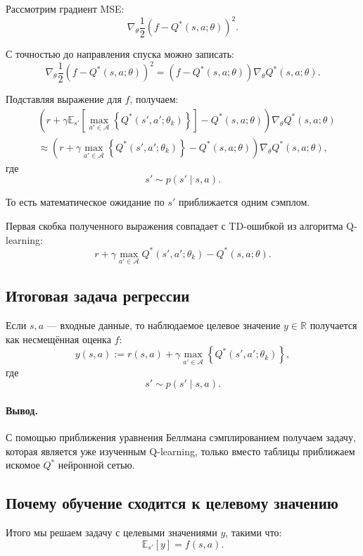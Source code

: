 \documentclass[12pt,a4paper]{article}
\begin{document}
Рассмотрим градиент MSE:
\[
\nabla_\theta
\frac{1}{2}
\left(
f
-
Q^\ast(s,a;\theta)
\right)^2.
\]

С точностью до направления спуска можно записать:
\[
\nabla_\theta
\frac{1}{2}
\left(
f
-
Q^\ast(s,a;\theta)
\right)^2
=
\left(
f
-
Q^\ast(s,a;\theta)
\right)
\nabla_\theta Q^\ast(s,a;\theta).
\]

Подставляя выражение для $f$, получаем:
\[
\begin{aligned}
&
\left(
r
+
\gamma
\mathbb E_{s'}
\left[
\max_{a' \in \mathcal A}
\left\{
Q^\ast(s',a';\theta_k)
\right\}
\right]
-
Q^\ast(s,a;\theta)
\right)
\nabla_\theta Q^\ast(s,a;\theta)
\\
&\approx
\left(
r
+
\gamma
\max_{a' \in \mathcal A}
\left\{
Q^\ast(s',a';\theta_k)
\right\}
-
Q^\ast(s,a;\theta)
\right)
\nabla_\theta Q^\ast(s,a;\theta),
\end{aligned}
\]
где
\[
s' \sim p(s'\mid s,a).
\]

То есть математическое ожидание по $s'$ приближается одним сэмплом.

Первая скобка полученного выражения совпадает с TD-ошибкой из алгоритма Q-learning:
\[
r
+
\gamma
\max_{a' \in \mathcal A}
Q^\ast(s',a';\theta_k)
-
Q^\ast(s,a;\theta).
\]

\subsection{Итоговая задача регрессии}

Если $s,a$ --- входные данные, то наблюдаемое целевое значение $y \in \mathbb R$ получается как несмещённая оценка $f$:
\[
y(s,a)
:=
r(s,a)
+
\gamma
\max_{a' \in \mathcal A}
\left\{
Q^\ast(s',a';\theta_k)
\right\},
\]
где
\[
s' \sim p(s'\mid s,a).
\]

\paragraph{Вывод.}

С помощью приближения уравнения Беллмана сэмплированием получаем задачу, которая является уже изученным Q-learning, только вместо таблицы приближаем искомое $Q^\ast$ нейронной сетью.

\subsection{Почему обучение сходится к целевому значению}

Итого мы решаем задачу с целевыми значениями $y$, такими что:
\[
\mathbb E_{s'}[y]
=
f(s,a).
\]
\end{document}
